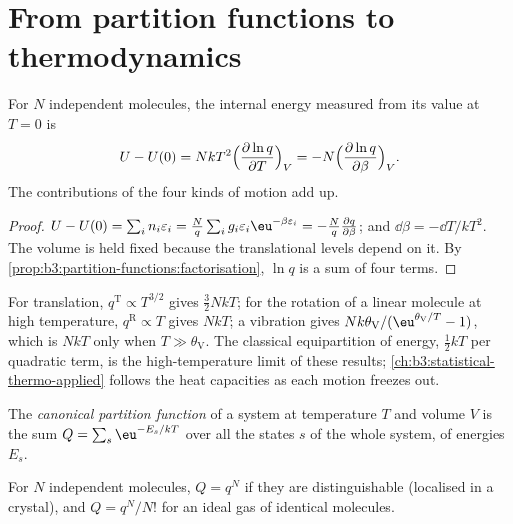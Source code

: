 \section{From partition functions to thermodynamics}

\begin{theorem}\label{thm:b3:partition-functions:internal-energy}
For $N$ independent molecules, the internal energy measured from its value at
$T = 0$ is
\[
  U - U(0) = NkT^2\Bigl(\frac{\partial\ln q}{\partial T}\Bigr)_V
          = -N\Bigl(\frac{\partial\ln q}{\partial\beta}\Bigr)_V .
\]
The contributions of the four kinds of motion add up.
\end{theorem}

\begin{proof}
$U - U(0) = \sum_in_i\varepsilon_i = \frac Nq\sum_ig_i\varepsilon_i\eu^{-\beta\varepsilon_i} = -\frac Nq\frac{\partial q}{\partial\beta}$;
and $\dd\beta = -\dd T/kT^2$. The volume is held fixed because the translational
levels depend on it. By \cref{prop:b3:partition-functions:factorisation}, $\ln q$ is a
sum of four terms.
\end{proof}

For translation, $q^{\mathrm T} \propto T^{3/2}$ gives $\frac32NkT$; for the rotation of a linear
molecule at high temperature, $q^{\mathrm R} \propto T$ gives $NkT$; a vibration gives
$Nk\theta_{\mathrm V}/(\eu^{\theta_{\mathrm V}/T} - 1)$, which is $NkT$ only when $T \gg \theta_{\mathrm V}$. The
classical equipartition of energy, $\frac12kT$ per quadratic term, is the
high-temperature limit of these results; \cref{ch:b3:statistical-thermo-applied}
follows the heat capacities as each motion freezes out.

\begin{definition}\label{def:b3:partition-functions:canonical}
The \emph{canonical partition function} of a
system at temperature $T$ and volume $V$ is the sum $Q = \sum_s\eu^{-E_s/kT}$ over all the
states $s$ of the whole system, of energies $E_s$.
\end{definition}

\begin{proposition}\label{prop:b3:partition-functions:canonical}
For $N$ independent molecules, $Q = q^N$ if they are distinguishable (localised in
a crystal), and $Q = q^N/N!$ for an ideal gas of identical molecules.
\end{proposition}

